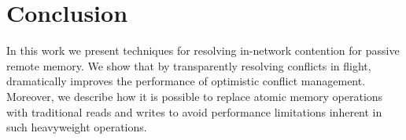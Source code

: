 \section{Conclusion}

In this work we present techniques for resolving in-network contention
for passive remote memory. We show that by transparently resolving
conflicts in flight, {\sword} dramatically improves the performance of
optimistic conflict management.  Moreover, we describe how it is
possible to replace atomic memory operations with traditional reads
and writes to avoid performance limitations inherent in such
heavyweight operations.
